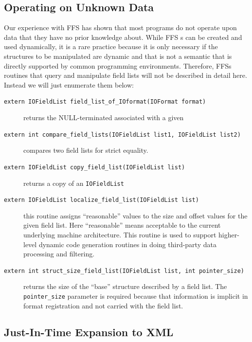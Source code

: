 \subsection{Operating on Unknown Data}
Our experience with FFS has shown that most programs do not operate upon
data that they have no prior knowledge about.  While FFS
s can be created and used dynamically, it is a rare
practice because it is only necessary if the structures to be manipulated
are dynamic and that is not a semantic that is directly supported by common
programming environments.  Therefore, FFSs routines that query and
manipulate field lists will not be described in detail here.  Instead we
will just enumerate them below:
\begin{description}
\item[{\tt extern IOFieldList field\_list\_of\_IOformat(IOFormat format)}]
returns the NULL-terminated  associated with a given
\item[{\tt extern int compare\_field\_lists(IOFieldList list1, IOFieldList
list2)}]
compares two field lists for strict equality.
\item[{\tt extern IOFieldList copy\_field\_list(IOFieldList list)}]
returns a copy of an {\tt IOFieldList}
\item[{\tt extern IOFieldList localize\_field\_list(IOFieldList list)}]
this routine assigns ``reasonable'' values to the size and offset values
for the given field list.  Here ``reasonable'' means acceptable to the
current underlying machine architecture.  This routine is used to support
higher-level dynamic code generation routines in doing third-party data
processing and filtering.
\item[{\tt extern int struct\_size\_field\_list(IOFieldList list, int pointer\_size)}]
returns the size of the ``base'' structure described by a field list.  The
{\tt pointer\_size} parameter is required because that information is
implicit in format registration and not carried with the field list.
\end{description}

\subsection{Just-In-Time Expansion to XML}

